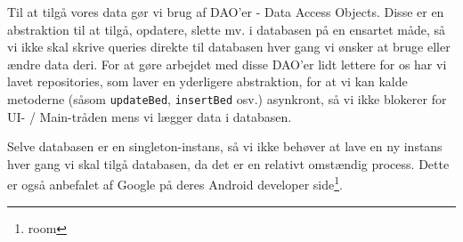 Til at tilgå vores data gør vi brug af DAO'er - Data Access Objects. Disse er en abstraktion til at tilgå, opdatere, slette mv. i databasen på en ensartet måde, så vi ikke skal skrive queries direkte til databasen hver gang vi ønsker at bruge eller ændre data deri.
For at gøre arbejdet med disse DAO'er lidt lettere for os har vi lavet repositories, som laver en yderligere abstraktion, for at vi kan kalde metoderne (såsom \texttt{updateBed}, \texttt{insertBed} osv.) asynkront, så vi ikke blokerer for UI- / Main-tråden mens vi lægger data i databasen.

Selve databasen er en singleton-instans, så vi ikke behøver at lave en ny instans hver gang vi skal tilgå databasen, da det er en relativt omstændig process. Dette er også anbefalet af Google på deres Android developer side\footnote{room}.
